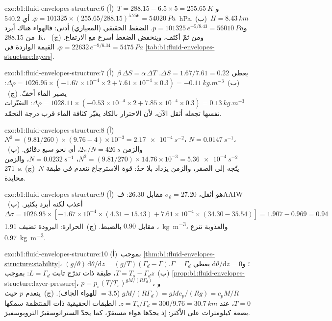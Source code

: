 \begin{solution}{exo:b1:fluid-envelopes-structure:6}
(أ)~$T = 288.15 - 6.5 \times 5 = \qty{255.65}{K}$ و$p = \num{101325} \times
(255.65/288.15)^{5.256} = \qty{54020}{Pa}$، أي \qty{540.2}{hPa}. (ب)~$H =
\qty{8.43}{km}$ و$p = \num{101325}\,e^{-5/8.43} = \qty{56010}{Pa}$. الضغط الحقيقي (المعياري) أدنى: فالهواء هناك أبرد من \qty{288.15}{K}، ومن ثمّ أكثف، وينخفض الضغط أسرع مع الارتفاع. (ج)~$p = \num{22632}\,
e^{-9/6.34} = \qty{5475}{Pa}$، القيمة الواردة في
\cref{tab:b1:fluid-envelopes-structure:layers}.
\end{solution}

\begin{solution}{exo:b1:fluid-envelopes-structure:7}
(أ)~$\beta\,\Delta S = \alpha\,\Delta T$ يعطي $\Delta S = 1.67/7.61 = 0.22$.
(ب)~$\Delta\rho = 1026.95 \times (-1.67\times10^{-4} \times 2 + 7.61\times10^{-4}
\times 0.3) = \qty{-0.11}{kg.m^{-3}}$: يصير الماء أخفّ.
(ج)~$\Delta\rho = 1028.11 \times (-0.53\times10^{-4} \times 2 + 7.85\times10^{-4}
\times 0.3) = \qty{+0.13}{kg.m^{-3}}$: التغيّرات نفسها تجعله أثقل الآن، لأن الاحترار بالكاد يغيّر كثافة الماء قرب درجة التجمّد.
\end{solution}

\begin{solution}{exo:b1:fluid-envelopes-structure:8}
(أ)~$N^2 = (9.81/260) \times (9.76 - 4)\times10^{-3} = \qty{2.17e-4}{s^{-2}}$،
$N = \qty{0.0147}{s^{-1}}$، والزمن $2\pi/N = \qty{426}{s}$، أي نحو سبع
دقائق. (ب)~$N^2 = (9.81/270) \times 14.76\times10^{-3} = \qty{5.36e-4}{s^{-2}}$،
$N = \qty{0.0232}{s^{-1}}$، والزمن \qty{271}{s}. (ج)~$N$ يتّجه إلى الصفر، والزمن يزداد بلا حدّ: قوة الاسترجاع تنعدم في طبقة محايدة.
\end{solution}

\begin{solution}{exo:b1:fluid-envelopes-structure:9}
(أ)~هو أثقل، $\sigma_\theta = 27.20$ مقابل 26.30: فAAIW أعذب لكنه أبرد بكثير. (ب)~$\Delta\sigma = 1026.95 \times [-1.67\times10^{-4} \times
(4.31 - 15.43) + 7.61\times10^{-4} \times (34.30 - 35.54)] = 1.907 - 0.969 =
0.94$، مقابل $0.90$ بالضبط. (ج)~الحرارة: البرودة تضيف
\qty{1.91}{kg.m^{-3}}، والعذوبة تنزع \qty{0.97}{kg.m^{-3}}.
\end{solution}

\begin{solution}{exo:b1:fluid-envelopes-structure:10}
(أ)~بموجب \cref{thm:b1:fluid-envelopes-structure:stability}، $(g/\theta)\,\mathrm
d\theta/\mathrm dz = (g/T)(\Gamma_d - \Gamma)$؛ و$\mathrm d\theta/\mathrm dz = 0$
يعطي $\Gamma = \Gamma_d$. (ب)~$T = T_s - \Gamma_d z$، طبقة ذات تدرّج ثابت
$L = \Gamma_d$: بموجب \cref{prop:b1:fluid-envelopes-structure:layer-pressure}، $p =
p_s (T/T_s)^{gM/(R\Gamma_d)}$، و$gM/(R\Gamma_d) = gMc_p/(Rg) = c_pM/R$
($= 3.5$ للهواء الجاف). (ج)~ينعدم $p$ حيث $T = 0$، عند $z = T_s/\Gamma_d =
300/9.76 = \qty{30.7}{km}$. الطبقات الحقيقية ذات  المنتظمة سمكها بضعة كيلومترات على الأكثر: إذ يحدّها هواء مستقرّ، كما يحدّ الستراتوسفيرُ التروبوسفيرَ.
\end{solution}

